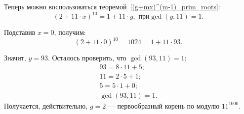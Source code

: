 \begin{solution}
Теперь можно воспользоваться теоремой~\ref{(g+mx)^(m-1)_prim_roots}:
\begin{equation*}
    {\left( 2 + 11\cdot x \right)}^{10} = 1 + 11\cdot y, \text{ при} \operatorname{gcd}(y, 11) = 1.
\end{equation*} \par
Подставив $x = 0$, получим:
\begin{equation*}
    {\left( 2 + 11\cdot 0 \right)}^{10} = 1024 = 1 + 11\cdot 93.
\end{equation*} \par
Значит, $y = 93$. Осталось проверить, что $\operatorname{gcd}(93, 11) = 1$:
\begin{align*}
    93 = 8\cdot11 + 5;\\
    11 = 2\cdot5 + 1;\\
    5 = 5\cdot1 + 0;\\
    \operatorname{gcd}(93, 11) = 1.
\end{align*}
Получается, действительно, $g = 2$ --- первообразный корень по модулю $11^{1000}$.
\end{solution}
